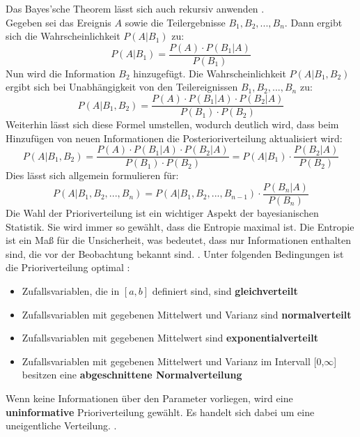 \documentclass[a4paper,12pt]{article}
\begin{document}
Das Bayes'sche Theorem lässt sich auch rekursiv anwenden \parencite[17]{EinfBayesStatistik}. \\
Gegeben sei das Ereignis $A$ sowie die Teilergebnisse $B_1, B_2, ..., B_n$. Dann ergibt sich die Wahrscheinlichkeit $P(A|B_1)$ zu:
\begin{equation}
P(A|B_1) = \frac{P(A) \cdot P(B_1|A)}{P(B_1)}
\end{equation}
Nun wird die Information $B_2$ hinzugefügt. Die Wahrscheinlichkeit $P(A|B_1, B_2)$ ergibt sich bei Unabhängigkeit von den Teilereignissen $B_1, B_2, ..., B_n$ zu:
\begin{equation}
P(A|B_1, B_2) = \frac{P(A) \cdot P(B_1|A) \cdot P(B_2|A)}{P(B_1) \cdot P(B_2)}
\end{equation}
Weiterhin lässt sich diese Formel umstellen, wodurch deutlich wird, dass beim Hinzufügen von neuen Informationen die Posterioriverteilung aktualisiert wird:
\begin{equation}
P(A|B_1, B_2) = \frac{P(A) \cdot P(B_1|A) \cdot P(B_2|A)}{P(B_1) \cdot P(B_2)} = P(A|B_1) \cdot \frac{P(B_2|A)}{P(B_2)}
\end{equation}
Dies lässt sich allgemein formulieren für:
\begin{equation}
P(A|B_1, B_2, ..., B_n) = P(A|B_1, B_2, ..., B_{n-1}) \cdot \frac{P(B_n|A)}{P(B_n)}
\end{equation}
Die Wahl der Prioriverteilung ist ein wichtiger Aspekt der bayesianischen Statistik. Sie wird immer so gewählt, dass die Entropie maximal ist. Die Entropie ist ein Maß für die Unsicherheit, was bedeutet, dass nur Informationen enthalten sind, die vor der Beobachtung bekannt sind. \parencite[57]{EinfBayesStatistik}. Unter folgenden Bedingungen ist die Prioriverteilung optimal \parencite[59]{EinfBayesStatistik}:
\begin{itemize}
  \item Zufallsvariablen, die in $[a,b]$ definiert sind, sind \textbf{gleichverteilt}
  \item Zufallsvariablen mit gegebenen Mittelwert und Varianz sind \textbf{normalverteilt}
  \item Zufallsvariablen mit gegebenen Mittelwert sind \textbf{exponentialverteilt}
  \item Zufallsvariablen mit gegebenen Mittelwert und Varianz im Intervall [0,$\infty$] besitzen eine \textbf{abgeschnittene Normalverteilung}
\end{itemize}
Wenn keine Informationen über den Parameter vorliegen, wird eine \textbf{uninformative} Prioriverteilung gewählt. Es handelt sich dabei um eine uneigentliche Verteilung. \parencite[57]{EinfBayesStatistik}.
\end{document}
